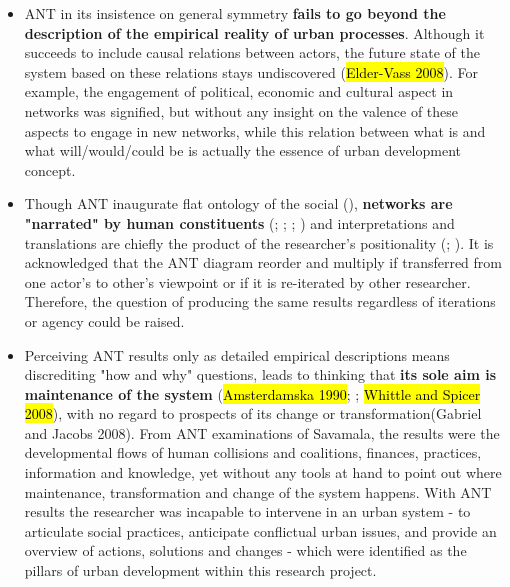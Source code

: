 \documentclass[11pt]{report}
\begin{document}
\begin{itemize}
\item ANT in its insistence on general symmetry \textbf{fails to go beyond the description of the empirical reality of urban processes}. Although it succeeds to include causal relations between actors, the future state of the system based on these relations stays undiscovered (\hl{Elder-Vass 2008}). For example, the engagement of political, economic and cultural aspect in networks was signified, but without any insight on the valence of these aspects to engage in new networks, while this relation between what is and what will/would/could be is actually the essence of urban development concept.

\item Though ANT inaugurate flat ontology of the social (\cite{Latour 2005}), \textbf{networks are "narrated" by human constituents} (\cite{Collins and Yearley 1992}; \cite{Czarniawska 1997}; \cite{Whittle and Spicer 2008};  \cite{Marshall and Staeheli 2015}) and interpretations and translations are chiefly the product of the researcher’s positionality  (\cite{Rose 1997}; \cite{Ruming 2009}). It is acknowledged that the ANT diagram reorder and multiply if transferred from one actor’s to other’s viewpoint or if it is re-iterated by other researcher. Therefore, the question of producing the same results regardless of iterations or agency could be raised.

\item Perceiving ANT results only as detailed empirical descriptions means discrediting "how and why" questions, leads to thinking that \textbf{its sole aim is maintenance of the system} (\hl{Amsterdamska 1990}; \cite{Lee and Brown 1994}; \hl{Whittle and Spicer 2008}), with no regard to prospects of its change or transformation(Gabriel and Jacobs 2008).
From ANT examinations of Savamala, the results were the developmental flows of human collisions and coalitions, finances, practices, information and knowledge, yet without any tools at hand to point out where maintenance, transformation and change of the system happens.
With ANT results the researcher was incapable to intervene in an urban system - to articulate social practices, anticipate conflictual urban issues, and provide an overview of actions, solutions and changes - which were identified as the pillars of urban development within this research project.
\end{itemize}
 
\end{document}
